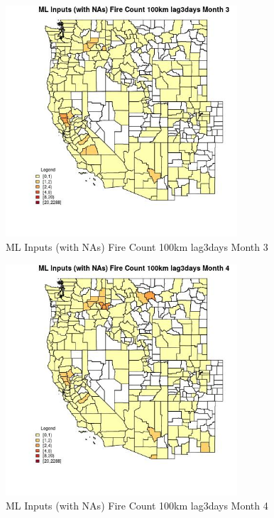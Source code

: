 \clearpage 

\begin{figure} 
\centering  
\includegraphics[width=0.77\textwidth]{Code_Outputs/Report_ML_input_PM25_Step4_part_e_de_duplicated_aves_compiled_2019-05-20wNAs_CountyFire_Count_100km_lag3daysmedianMonth3.jpg} 
\caption{\label{fig:Report_ML_input_PM25_Step4_part_e_de_duplicated_aves_compiled_2019-05-20wNAsCountyFire_Count_100km_lag3daysmedianMonth3}ML Inputs (with NAs) Fire Count 100km lag3days Month 3} 
\end{figure} 
 

\begin{figure} 
\centering  
\includegraphics[width=0.77\textwidth]{Code_Outputs/Report_ML_input_PM25_Step4_part_e_de_duplicated_aves_compiled_2019-05-20wNAs_CountyFire_Count_100km_lag3daysmedianMonth4.jpg} 
\caption{\label{fig:Report_ML_input_PM25_Step4_part_e_de_duplicated_aves_compiled_2019-05-20wNAsCountyFire_Count_100km_lag3daysmedianMonth4}ML Inputs (with NAs) Fire Count 100km lag3days Month 4} 
\end{figure} 
 

